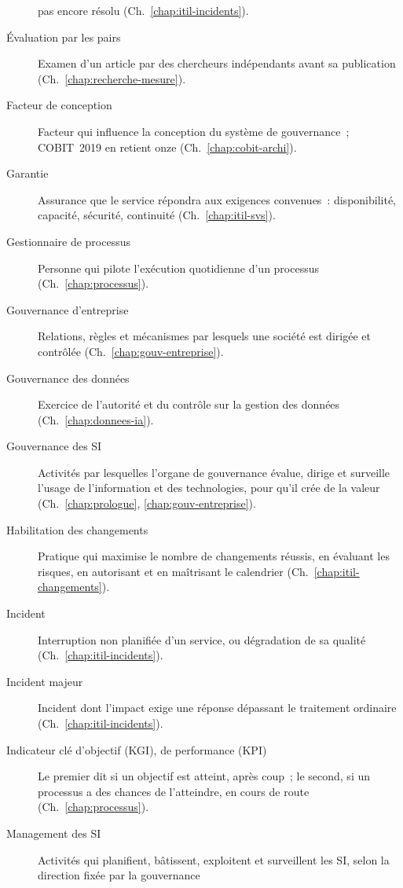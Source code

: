 \begin{description}
          pas encore résolu (Ch.~\ref{chap:itil-incidents}).
    \item[Évaluation par les pairs] Examen d'un article par des chercheurs
          indépendants avant sa publication (Ch.~\ref{chap:recherche-mesure}).
    \item[Facteur de conception] Facteur qui influence la conception du
          système de gouvernance~; COBIT~2019 en retient onze
          (Ch.~\ref{chap:cobit-archi}).
    \item[Garantie] Assurance que le service répondra aux exigences
          convenues~: disponibilité, capacité, sécurité, continuité
          (Ch.~\ref{chap:itil-svs}).
    \item[Gestionnaire de processus] Personne qui pilote l'exécution
          quotidienne d'un processus (Ch.~\ref{chap:processus}).
    \item[Gouvernance d'entreprise] Relations, règles et mécanismes par
          lesquels une société est dirigée et contrôlée
          (Ch.~\ref{chap:gouv-entreprise}).
    \item[Gouvernance des données] Exercice de l'autorité et du contrôle sur
          la gestion des données (Ch.~\ref{chap:donnees-ia}).
    \item[Gouvernance des SI] Activités par lesquelles l'organe de
          gouvernance évalue, dirige et surveille l'usage de l'information
          et des technologies, pour qu'il crée de la valeur
          (Ch.~\ref{chap:prologue}, \ref{chap:gouv-entreprise}).
    \item[Habilitation des changements] Pratique qui maximise le nombre de
          changements réussis, en évaluant les risques, en autorisant et en
          maîtrisant le calendrier (Ch.~\ref{chap:itil-changements}).
    \item[Incident] Interruption non planifiée d'un service, ou dégradation
          de sa qualité (Ch.~\ref{chap:itil-incidents}).
    \item[Incident majeur] Incident dont l'impact exige une réponse
          dépassant le traitement ordinaire (Ch.~\ref{chap:itil-incidents}).
    \item[Indicateur clé d'objectif (KGI), de performance (KPI)] Le premier
          dit si un objectif est atteint, après coup~; le second, si un
          processus a des chances de l'atteindre, en cours de route
          (Ch.~\ref{chap:processus}).
    \item[Management des SI] Activités qui planifient, bâtissent, exploitent
          et surveillent les SI, selon la direction fixée par la gouvernance

\end{description}
